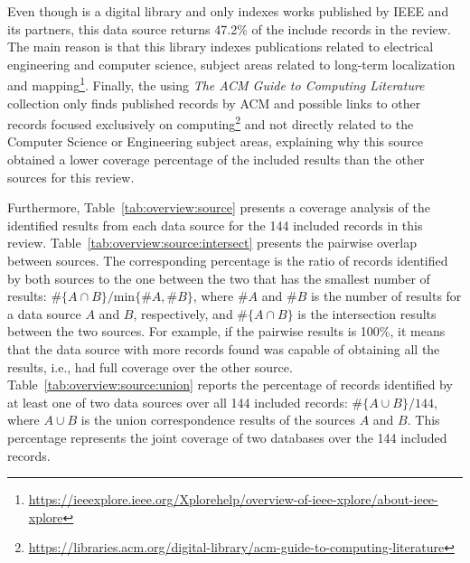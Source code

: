 Even though  is a digital library and only indexes works published by IEEE and its partners, this data source returns 47.2\% of the include records in the review. The main reason is that this library indexes publications related to electrical engineering and computer science, subject areas related to long-term localization and mapping\footnote{\url{https://ieeexplore.ieee.org/Xplorehelp/overview-of-ieee-xplore/about-ieee-xplore}}.
Finally, the  using \textit{The ACM Guide to Computing Literature} collection only finds published records by ACM and possible links to other records focused exclusively on computing\footnote{\url{https://libraries.acm.org/digital-library/acm-guide-to-computing-literature}} and not directly related to the Computer Science or Engineering subject areas, explaining why this source obtained a lower coverage percentage of the included results than the other sources for this review.

Furthermore, Table~\ref{tab:overview:source} presents a coverage analysis of the identified results from each data source for the 144 included records in this review. Table~\ref{tab:overview:source:intersect} presents the pairwise overlap between sources. The corresponding percentage is the ratio of records identified by both sources to the one between the two that has the smallest number of results: $\#\{A\cap B\} / \text{min}\{\#A,\#B\}$, where $\#A$ and $\#B$ is the number of results for a data source $A$ and $B$, respectively, and $\#\{A\cap B\}$ is the intersection results between the two sources. For example, if the pairwise results is 100\%, it means that the data source with more records found was capable of obtaining all the results, i.e., had full coverage over the other source. Table~\ref{tab:overview:source:union} reports the percentage of records identified by at least one of two data sources over all 144 included records: $\#\{A\cup B\} / 144$, where $A\cup B$ is the union correspondence results of the sources $A$ and $B$. This percentage represents the joint coverage of two databases over the 144 included records.
					
